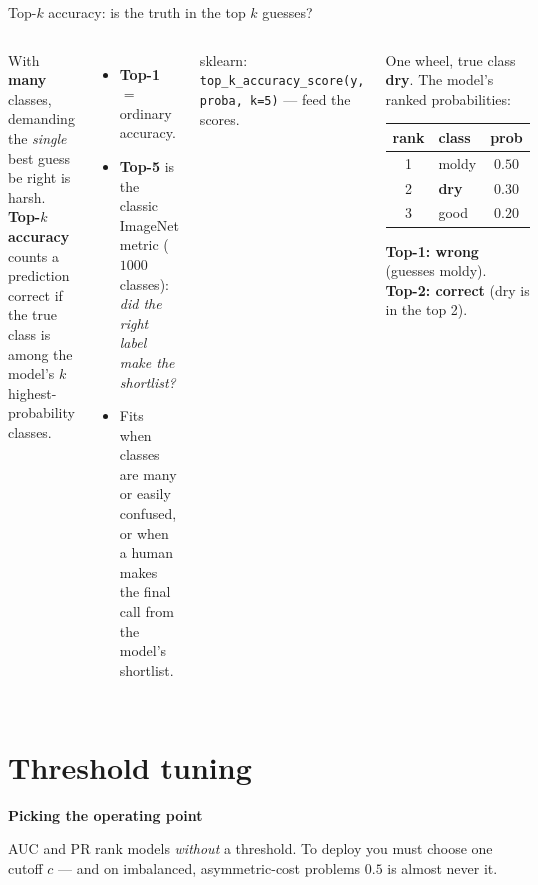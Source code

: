 \documentclass[aspectratio=169]{beamer}
\begin{document}
\begin{frame}{Top-$k$ accuracy: is the truth in the top $k$ guesses?}
  \begin{columns}[T]
    With \textbf{many} classes, demanding the \emph{single} best guess be right is harsh.
    \textbf{Top-$k$ accuracy} counts a prediction correct if the true class is among the model's
    $k$ highest-probability classes.
    \begin{itemize}\small
      \item \textbf{Top-1} $=$ ordinary accuracy.
      \item \textbf{Top-5} is the classic ImageNet metric ($1000$ classes): \emph{did the right
        label make the shortlist?}
      \item Fits when classes are many or easily confused, or when a human makes the final call
        from the model's shortlist.
    \end{itemize}
    \vskip 2pt
    \footnotesize sklearn: \texttt{top\_k\_accuracy\_score(y, proba, k=5)} --- feed the scores.
    \begin{center}\small
    One wheel, true class \textbf{dry}. The model's ranked probabilities:
    \vskip 3pt
    \renewcommand{\arraystretch}{1.25}
    \begin{tabular}{c l c}
      rank & class & prob \\
      \hline
      1 & moldy & $0.50$ \\
      2 & \textbf{dry} & $0.30$ \\
      3 & good & $0.20$ \\
      \hline
    \end{tabular}
    \vskip 5pt
    \textcolor{armred}{\textbf{Top-1: wrong}} (guesses moldy).\\
    \textcolor{paramgreen!60!black}{\textbf{Top-2: correct}} (dry is in the top 2).
    \end{center}
  \end{columns}
\end{frame}

\section{Threshold tuning}

\begin{frame}[plain]
  \vfill
  \begin{center}
    {\Large\color{popblue}\textbf{Picking the operating point}}\\[0.9em]
    \begin{minipage}{0.82\textwidth}\centering\small
      AUC and PR rank models \emph{without} a threshold. To deploy you must choose one
      cutoff $c$ --- and on imbalanced, asymmetric-cost problems $0.5$ is almost never it.
    \end{minipage}
  \end{center}
  \vfill
\end{frame}
\end{document}
